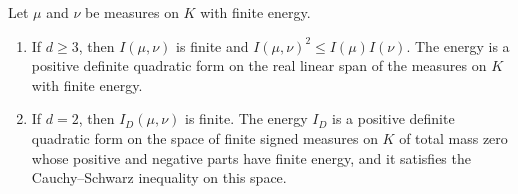\begin{proposition}\label{prop:kernel-energy-positivity}
Let $\mu$ and $\nu$ be measures on $K$ with finite energy.
\begin{enumerate}
\item If $d\geq3$, then $I(\mu,\nu)$ is finite and $I(\mu,\nu)^2\leq I(\mu)I(\nu)$. The energy is a positive definite quadratic form on the real linear span of the measures on $K$ with finite energy.
\item If $d=2$, then $I_D(\mu,\nu)$ is finite. The energy $I_D$ is a positive definite quadratic form on the space of finite signed measures on $K$ of total mass zero whose positive and negative parts have finite energy, and it satisfies the Cauchy--Schwarz inequality on this space.
\end{enumerate}
\end{proposition}
